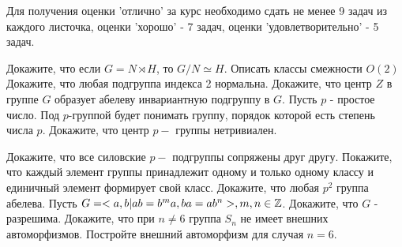 \documentclass[12pt]{article}
\begin{document}
	
	Для получения оценки 'отлично' за курс необходимо сдать не менее 9 задач из каждого листочка, оценки 'хорошо' - 7 задач, оценки 'удовлетворительно' - 5 задач. 
	
	\p
	Докажите, что если $G=N \rtimes H$, то $ G/N \simeq H$.
	\ep
	\p
	 Описать классы смежности $O(2)$
	\ep
	\p 
	Докажите, что любая подгруппа индекса 2 нормальна.
	\ep
		\p Докажите, что центр $Z$ в группе $G$ образует абелеву инвариантную подгруппу в $G$.
	\ep
	\df
	Пусть $p$ - простое число. Под $p$-группой будет понимать группу, порядок которой есть степень числа $p$.
	\edf
	\p Докажите, что центр $p-$ группы нетривиален.
	\ep

	
	\p Докажите, что все силовские $p-$ подгруппы сопряжены друг другу.
	\ep
	\p Покажите, что каждый элемент группы принадлежит одному и только одному классу и единичный элемент формирует свой класс.
	\ep
	\p
	Докажите, что любая $p^2$ группа абелева.
	\ep
	\p Пусть $G = <a,b | ab=b^m a, ba = ab^n>, m,n \in {\mathbb Z}$. Докажите, что $G$ - разрешима.
	\ep
	\p Докажите, что при $n \neq 6$ группа $S_n$ не имеет внешних автоморфизмов. Постройте внешний автоморфизм для случая $n=6$.
	\ep

	
\end{document}
